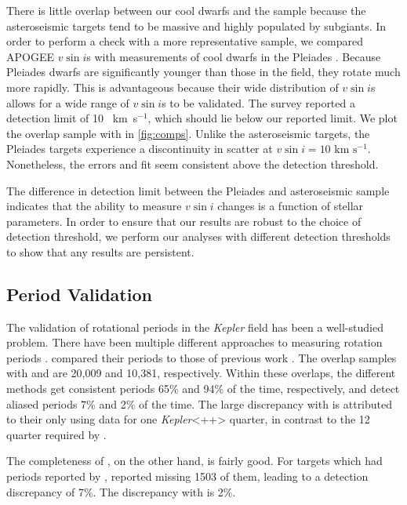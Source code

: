 \documentclass[manuscript]{aastex6}
\newcommand{\vsini}{\ensuremath{v \sin i}}
\newcommand{\Kepler}{\mbox{\textit{Kepler}}}
\newcommand{\kms}{\textrm{~km~s}\ensuremath{^{-1}}}
\begin{document}
There is little overlap between our cool dwarfs and the 
\citet{Bruntt12} sample because the asteroseismic targets tend to be massive and 
highly populated by subgiants. In order to perform a check with a more
representative sample, we compared APOGEE \vsini{}s with  
measurements of cool dwarfs in the Pleiades \citep{Stauffer87}. Because
Pleiades dwarfs are significantly younger than those in the field,
they rotate much more rapidly. This is advantageous because their 
wide distribution of \vsini{}s allows for a wide range of \vsini{}s to be 
validated. The \citet{Stauffer87} survey reported a detection limit of
10 \kms, which should lie below our reported limit. We plot the overlap 
sample with \citet{Stauffer87} in \cref{fig:comps}.  Unlike the asteroseismic 
targets, the Pleiades targets experience a discontinuity in scatter at 
\(\vsini = 10 \kms\).  Nonetheless, the errors and fit seem consistent above 
the detection threshold.

The difference in detection limit between the Pleiades and asteroseismic sample
indicates that the ability to measure \vsini{} changes is a function of stellar
parameters. In order to ensure that our results are robust to the choice of
detection threshold, we
perform our analyses with different detection thresholds to show that any
results are persistent.

\subsection{Period Validation}

The validation of rotational periods in the \Kepler{} field has been a
well-studied problem. There have been multiple different approaches to
measuring rotation periods \citep{Reinhold13,Nielsen13,McQuillan14,Garcia14}.
\citet{McQuillan14} compared their periods to those of previous work
\citep{Reinhold13,Nielsen13}. The overlap samples with
\citet{Reinhold13} and \citet{Nielsen13} are 20,009 and 10,381,
respectively. Within these overlaps, the different methods get
consistent periods 65\% and 94\% of the time, respectively, and detect
aliased periods 7\% and 2\% of the time. The large discrepancy with
\citet{Reinhold13} is attributed to their only using data for one
\Kepler{}<++> quarter, in contrast to the 12 quarter required by 
\citet{McQuillan14}.

The completeness of \citet{McQuillan14}, on the other hand, is fairly
good. For targets which had periods reported by \citet{Reinhold13},
\citet{McQuillan14} reported missing 1503 of them, leading to a detection
discrepancy of 7\%. The discrepancy with \citet{Nielsen13} is 2\%.
\end{document}
